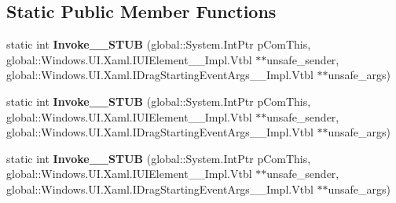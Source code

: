 \subsection*{Static Public Member Functions}
\begin{DoxyCompactItemize}
\item 
\mbox{\label{struct_windows_1_1_foundation_1_1_typed_event_handler___a___windows___u_i___xaml___u_i_element__45e7e61598f8bb4613234898c88fca41_a9144e3110595b584420e9f3bda03c48d}} 
static int {\bfseries Invoke\+\_\+\+\_\+\+S\+T\+UB} (global\+::\+System.\+Int\+Ptr p\+Com\+This, global\+::\+Windows.\+U\+I.\+Xaml.\+I\+U\+I\+Element\+\_\+\+\_\+\+Impl.\+Vtbl $\ast$$\ast$unsafe\+\_\+sender, global\+::\+Windows.\+U\+I.\+Xaml.\+I\+Drag\+Starting\+Event\+Args\+\_\+\+\_\+\+Impl.\+Vtbl $\ast$$\ast$unsafe\+\_\+args)
\item 
\mbox{\label{struct_windows_1_1_foundation_1_1_typed_event_handler___a___windows___u_i___xaml___u_i_element__45e7e61598f8bb4613234898c88fca41_a9144e3110595b584420e9f3bda03c48d}} 
static int {\bfseries Invoke\+\_\+\+\_\+\+S\+T\+UB} (global\+::\+System.\+Int\+Ptr p\+Com\+This, global\+::\+Windows.\+U\+I.\+Xaml.\+I\+U\+I\+Element\+\_\+\+\_\+\+Impl.\+Vtbl $\ast$$\ast$unsafe\+\_\+sender, global\+::\+Windows.\+U\+I.\+Xaml.\+I\+Drag\+Starting\+Event\+Args\+\_\+\+\_\+\+Impl.\+Vtbl $\ast$$\ast$unsafe\+\_\+args)
\item 
\mbox{\label{struct_windows_1_1_foundation_1_1_typed_event_handler___a___windows___u_i___xaml___u_i_element__45e7e61598f8bb4613234898c88fca41_a9144e3110595b584420e9f3bda03c48d}} 
static int {\bfseries Invoke\+\_\+\+\_\+\+S\+T\+UB} (global\+::\+System.\+Int\+Ptr p\+Com\+This, global\+::\+Windows.\+U\+I.\+Xaml.\+I\+U\+I\+Element\+\_\+\+\_\+\+Impl.\+Vtbl $\ast$$\ast$unsafe\+\_\+sender, global\+::\+Windows.\+U\+I.\+Xaml.\+I\+Drag\+Starting\+Event\+Args\+\_\+\+\_\+\+Impl.\+Vtbl $\ast$$\ast$unsafe\+\_\+args)
\item 
\mbox{\label{struct_windows_1_1_foundation_1_1_typed_event_handler___a___windows___u_i___xaml___u_i_element__45e7e61598f8bb4613234898c88fca41_a9144e3110595b584420e9f3bda03c48d}} 

\end{DoxyCompactItemize}
